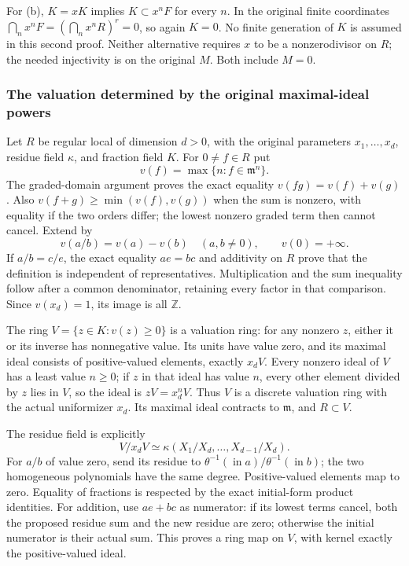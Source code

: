 For (b), \(K=xK\) implies \(K\subset x^nF\) for every \(n\). In the original finite coordinates \(\bigcap_n x^nF=(\bigcap_n x^nR)^r=0\), so again \(K=0\). No finite generation of \(K\) is assumed in this second proof. Neither alternative requires \(x\) to be a nonzerodivisor on \(R\); the needed injectivity is on the original \(M\). Both include \(M=0\).

\subsubsection{The valuation determined by the original maximal-ideal powers}\label{algebra-proof-020-the-valuation-determined-by-the-original-maximal-ideal-powers}

Let \(R\) be regular local of dimension \(d>0\), with the original parameters \(x_1,\ldots,x_d\), residue field \(\kappa\), and fraction field \(K\). For \(0\ne f\in R\) put \[
 v(f)=\max\{n:f\in\mathfrak m^n\}.
\] The graded-domain argument proves the exact equality \(v(fg)=v(f)+v(g)\). Also \(v(f+g)\ge\min(v(f),v(g))\) when the sum is nonzero, with equality if the two orders differ; the lowest nonzero graded term then cannot cancel. Extend by \[
 v(a/b)=v(a)-v(b)\quad(a,b\ne0),\qquad v(0)=+\infty.
\] If \(a/b=c/e\), the exact equality \(ae=bc\) and additivity on \(R\) prove that the definition is independent of representatives. Multiplication and the sum inequality follow after a common denominator, retaining every factor in that comparison. Since \(v(x_d)=1\), its image is all \(\mathbb Z\).

The ring \(V=\{z\in K:v(z)\ge0\}\) is a valuation ring: for any nonzero \(z\), either it or its inverse has nonnegative value. Its units have value zero, and its maximal ideal consists of positive-valued elements, exactly \(x_dV\). Every nonzero ideal of \(V\) has a least value \(n\ge0\); if \(z\) in that ideal has value \(n\), every other element divided by \(z\) lies in \(V\), so the ideal is \(zV=x_d^nV\). Thus \(V\) is a discrete valuation ring with the actual uniformizer \(x_d\). Its maximal ideal contracts to \(\mathfrak m\), and \(R\subset V\).

The residue field is explicitly \[
 V/x_dV\simeq
 \kappa(X_1/X_d,\ldots,X_{d-1}/X_d).
\] For \(a/b\) of value zero, send its residue to \(\theta^{-1}(\operatorname{in}a)/\theta^{-1}(\operatorname{in}b)\); the two homogeneous polynomials have the same degree. Positive-valued elements map to zero. Equality of fractions is respected by the exact initial-form product identities. For addition, use \(ae+bc\) as numerator: if its lowest terms cancel, both the proposed residue sum and the new residue are zero; otherwise the initial numerator is their actual sum. This proves a ring map on \(V\), with kernel exactly the positive-valued ideal.

